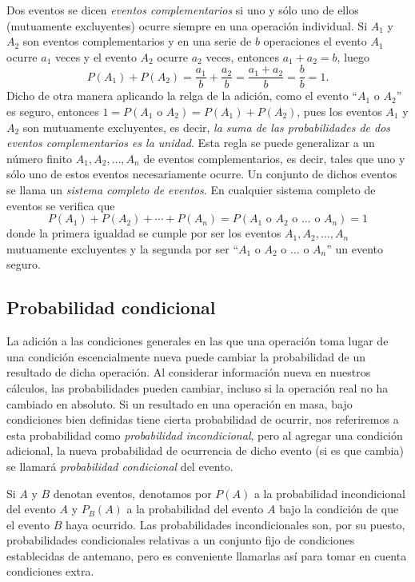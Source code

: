 Dos eventos se dicen \emph{eventos complementarios} si uno y sólo uno de ellos (mutuamente excluyentes) ocurre siempre en una operación individual. Si $A_1$ y $A_2$ son eventos complementarios y en una serie de $b$ operaciones el evento $A_1$ ocurre $a_1$ veces y el evento $A_2$ ocurre $a_2$ veces, entonces $a_1+a_2=b$, luego
\begin{equation*}
    P(A_1)+P(A_2)=\frac{a_1}{b}+\frac{a_2}{b}=\frac{a_1+a_2}{b}=\frac{b}{b}=1.
\end{equation*}
Dicho de otra manera aplicando la relga de la adición, como el evento ``$A_1$ o $A_2$'' es seguro, entonces $1=P(A_1 \text{ o } A_2)=P(A_1)+P(A_2)$, pues los eventos $A_1$ y $A_2$ son mutuamente excluyentes, es decir, \emph{la suma de las probabilidades de dos eventos complementarios es la unidad}. Esta regla se puede generalizar a un número finito $A_1,A_2,\ldots,A_n$ de eventos complementarios, es decir, tales que uno y sólo uno de estos eventos necesariamente ocurre. Un conjunto de dichos eventos se llama un \emph{sistema completo de eventos}. En cualquier sistema completo de eventos se verifica que
\begin{equation*}
    P(A_1)+P(A_2)+\cdots+P(A_n) = P(A_1 \text{ o } A_2 \text{ o } \ldots \text{ o } A_n) =1
\end{equation*}
donde la primera igualdad se cumple por ser los eventos $A_1,A_2,\ldots,A_n$ mutuamente excluyentes y la segunda por ser ``$A_1$ o $A_2$ o $\ldots$ o $A_n$'' un evento seguro.

\subsection{Probabilidad condicional}

La adición a las condiciones generales en las que una operación toma lugar de una condición escencialmente nueva puede cambiar la probabilidad de un resultado de dicha operación. Al considerar información nueva en nuestros cálculos, las probabilidades pueden cambiar, incluso si la operación real no ha cambiado en absoluto. Si un resultado en una operación en masa, bajo condiciones bien definidas tiene cierta probabilidad de ocurrir, nos referiremos a esta probabilidad como \emph{probabilidad incondicional}, pero al agregar una condición adicional, la nueva probabilidad de ocurrencia de dicho evento (si es que cambia) se llamará \emph{probabilidad condicional} del evento.
\bigskip

Si $A$ y $B$ denotan eventos, denotamos por $P(A)$ a la probabilidad incondicional del evento $A$ y $P_B(A)$ a la probabilidad del evento $A$ bajo la condición de que el evento $B$ haya ocurrido. Las probabilidades incondicionales son, por su puesto, probabilidades condicionales relativas a un conjunto fijo de condiciones establecidas de antemano, pero es conveniente llamarlas así para tomar en cuenta condiciones extra.
